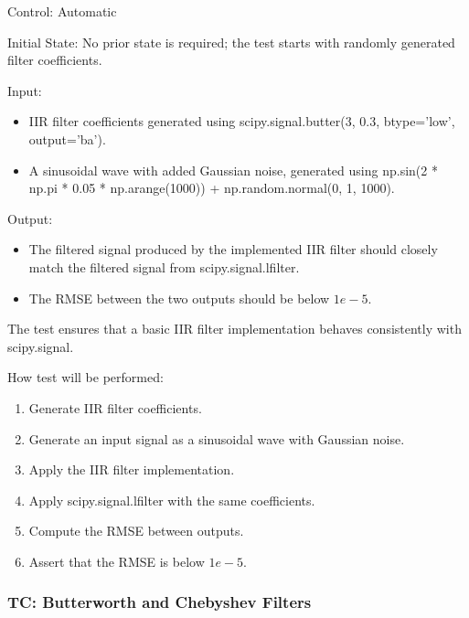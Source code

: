 \documentclass[12pt, titlepage]{article}
\begin{document}
\begin{enumerate}
Control: Automatic
					
Initial State: No prior state is required; the test starts with randomly
generated filter coefficients.
					
Input:
\begin{itemize}
  \item IIR filter coefficients generated using scipy.signal.butter(3, 0.3,
  btype='low', output='ba').
  \item A sinusoidal wave with added Gaussian noise, generated using np.sin(2 *
  np.pi * 0.05 * np.arange(1000)) + np.random.normal(0, 1, 1000).
\end{itemize}

Output:
\begin{itemize}
  \item The filtered signal produced by the implemented IIR filter should
  closely match the filtered signal from scipy.signal.lfilter.
  \item The RMSE between the two outputs should be below $1e-5$.
\end{itemize}

The test ensures that a basic IIR filter implementation behaves consistently
with scipy.signal.

How test will be performed: 
\begin{enumerate}
  \item Generate IIR filter coefficients.
  \item Generate an input signal as a sinusoidal wave with Gaussian noise.
  \item Apply the IIR filter implementation.
  \item Apply scipy.signal.lfilter with the same coefficients.
  \item Compute the RMSE between outputs.
  \item Assert that the RMSE is below $1e-5$.
\end{enumerate}

\end{enumerate}

 \label{TC_BUT_CHEB}
\subsubsection{TC\thetestcasenum : Butterworth and Chebyshev Filters}
\end{document}
